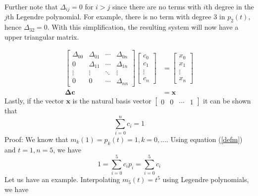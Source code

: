 Further note that $\Delta_{ij} = 0$ for $i>j$ since there are no terms with $i$th degree in the $j$th Legendre polynomial. For example, there is no term with degree 3 in $p_2(t)$, hence $\Delta_{32} = 0$. With this simplification, the resulting system will now have a upper triangular matrix.

\begin{align*}
\begin{bmatrix}
\Delta_{00} & \Delta_{01} & \cdots & \Delta_{0n}\\
0 & \Delta_{11} & \cdots & \Delta_{1n}\\
\vdots & \vdots & \ddots & \vdots\\
0 & 0 & \cdots & \Delta_{nn}
\end{bmatrix}
\begin{bmatrix}
c_0\\
c_1\\
\vdots\\
c_n
\end{bmatrix}
&=
\begin{bmatrix}
x_0\\
x_1\\
\vdots\\
x_n
\end{bmatrix}\\
\mathbf{\Delta c} &= \mathbf{x}
\end{align*}
Lastly, if the vector $\mathbf{x}$ is the natural basis vector $\begin{bmatrix}0 & 0 & \cdots & 1\end{bmatrix}$ it can be shown that
\begin{equation}\label{sumc}
\sum_{i=0}^{n}c_i = 1
\end{equation}
Proof: We know that $m_k(1) = p_k(t) = 1, k=0,\ldots$. Using equation (\ref{defm}) and $t=1, n=5$, we have
\begin{equation*}
1 = \sum_{i=0}^{5} c_ip_i = \boxed{\sum_{i=0}^{5} c_i}
\end{equation*}
Let us have an example. Interpolating $m_5(t) = t^5$ using Legendre polynomials, we have
